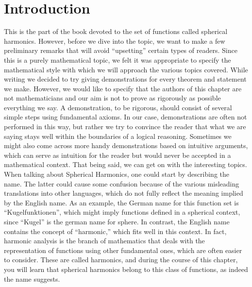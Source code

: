 
\section{Introduction \label{kugel:section:intro}}
This is the part of the book devoted to the set of functions called spherical harmonics. 
However, before we dive into the topic, we want to make a few preliminary remarks that will avoid ``upsetting'' certain types of readers. \newline
Since this is a purely mathematical topic, we felt it was appropriate to specify the mathematical style with which we will approach the various topics covered.\newline
While writing we decided to try giving demonstrations for every theorem and statement we make. However, we would like to specify that the authors of this chapter are not mathematicians and our aim is not to prove as rigorously as possible everything we say. \newline
A demonstration, to be rigorous, should consist of several simple steps using fundamental axioms. In our case, demonstrations are often not performed in this way, but rather we try to convince the reader that what we are saying stays well within the boundaries of a logical reasoning.\newline 
Sometimes we might also come across more handy demonstrations based on intuitive arguments, which can serve as intuition for the reader but would never be accepted in a mathematical context.\newline
That being said, we can get on with the interesting topics.\newline
When talking about Spherical Harmonics, one could start by describing the name. The latter could cause some confusion because of the various misleading translations into other languages, which do not fully reflect the meaning implied by the English name.\newline 
As an example, the German name for this function set is ``Kugelfunktionen'', which might imply functions defined in a spherical context, since ``Kugel'' is the german name for sphere.\newline
In contrast, the English name contains the concept of ``harmonic,'' which fits well in this context.\newline
In fact, harmonic analysis is the branch of mathematics that deals with the representation of functions using other fundamental ones, which are often easier to consider. These are called harmonics, and during the course of this chapter, you will learn that spherical harmonics belong to this class of functions, as indeed the name suggests.\newline
